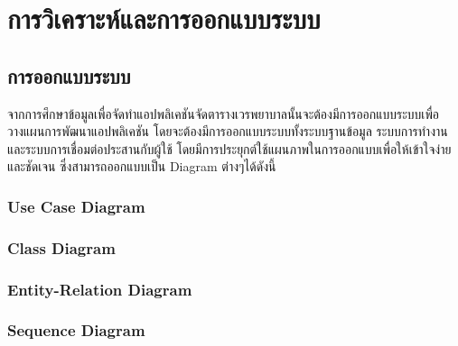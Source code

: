 \baselineskip=8mm
\chapter{การวิเคราะห์และการออกแบบระบบ}

\renewcommand{\thesubsection}{\arabic{subsection}.}
\renewcommand{\theequation}{\thesection.\arabic{equation}}
\renewcommand{\thesection}{}


\section{การออกแบบระบบ}

จากการศึกษาข้อมูลเพื่อจัดทำแอปพลิเคชันจัดตารางเวรพยาบาลนั้นจะต้องมีการออกแบบระบบเพื่อวางแผนการพัฒนาแอปพลิเคชัน โดยจะต้องมีการออกแบบระบบทั้งระบบฐานข้อมูล ระบบการทำงาน และระบบการเชื่อมต่อประสานกับผู้ใช้ โดยมีการประยุกต์ใช้แผนภาพในการออกแบบเพื่อให้เข้าใจง่ายและชัดเจน ซึ่งสามารถออกแบบเป็น Diagram ต่างๆได้ดังนี้

\hspace{0cm}\subsection{Use Case Diagram}

\hspace{0cm}\subsection{Class Diagram}

\hspace{0cm}\subsection{Entity-Relation Diagram}

\hspace{0cm}\subsection{Sequence Diagram}




